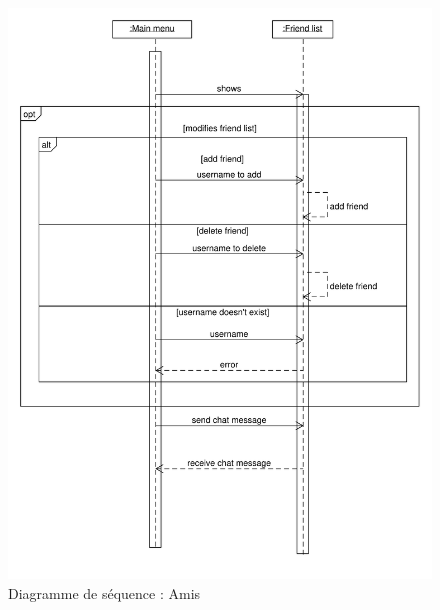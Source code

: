 \documentclass[a4paper,10pt]{article}
\begin{document}
\begin{figure}[H]
	\includegraphics[width=6in]{sequence/friends.pdf}
	\caption{Diagramme de séquence : Amis}
\end{figure}
\end{document}
